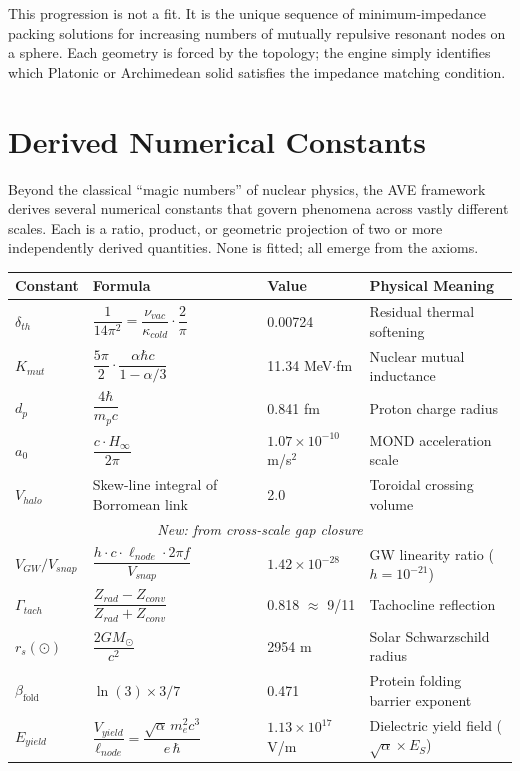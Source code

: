 This progression is not a fit. It is the unique sequence of minimum-impedance packing solutions for increasing numbers of mutually repulsive resonant nodes on a sphere. Each geometry is forced by the topology; the engine simply identifies which Platonic or Archimedean solid satisfies the impedance matching condition.

\section{Derived Numerical Constants}
\label{sec:derived_numerology}

Beyond the classical ``magic numbers'' of nuclear physics, the AVE
framework derives several numerical constants that govern phenomena
across vastly different scales.  Each is a ratio, product, or
geometric projection of two or more independently derived quantities.
None is fitted; all emerge from the axioms.

\begin{center}
\renewcommand{\arraystretch}{1.35}
\small
\begin{tabular}{l l l l}
\toprule
\textbf{Constant} & \textbf{Formula} & \textbf{Value} & \textbf{Physical Meaning} \\
\midrule
$\delta_{th}$ & $\dfrac{1}{14\pi^2}
    = \dfrac{\nu_{vac}}{\kappa_{cold}} \cdot \dfrac{2}{\pi}$
    & 0.00724
    & Residual thermal softening \\[6pt]
$K_{mut}$ & $\dfrac{5\pi}{2}\cdot\dfrac{\alpha\hbar c}{1-\alpha/3}$
    & 11.34 MeV$\cdot$fm
    & Nuclear mutual inductance \\[6pt]
$d_p$ & $\dfrac{4\hbar}{m_p c}$
    & 0.841 fm
    & Proton charge radius \\[6pt]
$a_0$ & $\dfrac{c \cdot H_\infty}{2\pi}$
    & $1.07\times10^{-10}$ m/s$^2$
    & MOND acceleration scale \\[6pt]
$V_{halo}$ & Skew-line integral of Borromean link
    & 2.0
    & Toroidal crossing volume \\[6pt]
\midrule
\multicolumn{4}{c}{\textit{New: from cross-scale gap closure}} \\[4pt]
$V_{GW}/V_{snap}$ & $\dfrac{h \cdot c \cdot \ell_{node} \cdot 2\pi f}{V_{snap}}$
    & $1.42\times10^{-28}$
    & GW linearity ratio ($h=10^{-21}$) \\[6pt]
$\Gamma_{tach}$ & $\dfrac{Z_{rad} - Z_{conv}}{Z_{rad} + Z_{conv}}$
    & 0.818 $\approx$ 9/11
    & Tachocline reflection \\[6pt]
$r_s(\odot)$ & $\dfrac{2GM_\odot}{c^2}$
    & 2954 m
    & Solar Schwarzschild radius \\[6pt]
$\beta_\text{fold}$ & $\ln(3) \times 3/7$
    & 0.471
    & Protein folding barrier exponent \\[6pt]
$E_{yield}$ & $\dfrac{V_{yield}}{\ell_{node}}
    = \dfrac{\sqrt{\alpha}\, m_e^2 c^3}{e\, \hbar}$
    & $1.13\times10^{17}$ V/m
    & Dielectric yield field ($\sqrt{\alpha}\times E_S$) \\[6pt]
\bottomrule
\end{tabular}
\end{center}

